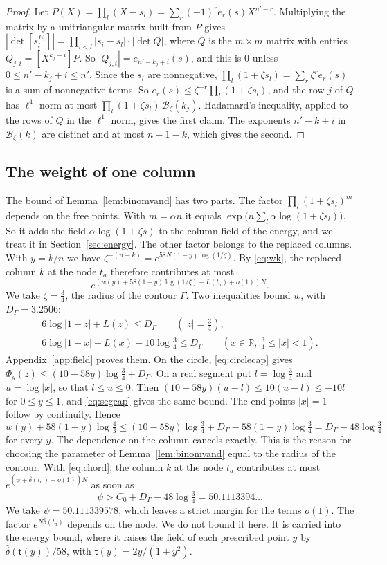 \documentclass[11pt]{amsart}
\newcommand{\Psiw}{50.111339578}
\newcommand{\Dcirc}{3.2506}
\theoremstyle{definition}
\theoremstyle{remark}
\numberwithin{equation}{section}
\newcommand{\R}{\mathbb R}
\begin{document}
\begin{proof}
Let $P(X)=\prod_l(X-s_l)=\sum_r(-1)^re_r(s)X^{n'-r}$. Multiplying the matrix by a unitriangular matrix built
from $P$ gives $|\det[s_l^{E_i}]|=\prod_{i<l}|s_i-s_l|\cdot|\det Q|$, where $Q$ is the $m\times m$ matrix with
entries $Q_{j,i}=[X^{k_j-i}]P$. So $|Q_{j,i}|=e_{n'-k_j+i}(s)$, and this is $0$ unless $0\le n'-k_j+i\le n'$.
Since the $s_l$ are nonnegative, $\prod_l(1+\zeta s_l)=\sum_r\zeta^re_r(s)$ is a sum of nonnegative terms. So
$e_r(s)\le\zeta^{-r}\prod_l(1+\zeta s_l)$, and the row $j$ of $Q$ has $\ell^1$ norm at most
$\prod_l(1+\zeta s_l)\,\mathcal B_\zeta(k_j)$. Hadamard's inequality, applied to the rows of $Q$ in the $\ell^1$ norm,
gives the first claim. The exponents $n'-k+i$ in $\mathcal B_\zeta(k)$ are distinct and at most $n-1-k$, which gives the
second.
\end{proof}

\subsection{The weight of one column}\label{ssec:weights}
The bound of Lemma~\ref{lem:binomvand} has two parts. The factor $\prod_l(1+\zeta s_l)^m$ depends on the free points.
With $m=\alpha n$ it equals $\exp\bigl(n\sum_l\alpha\log(1+\zeta s_l)\bigr)$. So it adds the field
$\alpha\log(1+\zeta s)$ to the column field of the energy, and we treat it in Section~\ref{sec:energy}. The other factor
belongs to the replaced columns. With $y=k/n$ we have $\zeta^{-(n-k)}=e^{58N(1-y)\log(1/\zeta)}$. By \eqref{eq:wk}, the
replaced column $k$ at the node $t_a$ therefore contributes at most
\[
 e^{(w(y)+58(1-y)\log(1/\zeta)-L(t_a)+o(1))N}.
\]
We take $\zeta=\frac34$, the radius of the contour $\Gamma$. Two inequalities bound $w$, with $D_\Gamma=\Dcirc$:
\begin{gather}
 6\log|1-z|+L(z)\le D_\Gamma\qquad(|z|=\tfrac34),\label{eq:circlecap}\\
 6\log|1-x|+L(x)-10\log\tfrac34\le D_\Gamma\qquad(x\in\R,\ \tfrac34\le|x|<1).\label{eq:segcap}
\end{gather}
Appendix~\ref{app:field} proves them. On the circle, \eqref{eq:circlecap} gives
$\Phi_y(z)\le(10-58y)\log\frac34+D_\Gamma$. On a real segment put $l=\log\frac34$ and $u=\log|x|$, so that $l\le u\le0$.
Then $(10-58y)(u-l)\le10(u-l)\le-10l$ for $0\le y\le1$, and \eqref{eq:segcap} gives the same bound. The end points
$|x|=1$ follow by continuity. Hence
\[
 w(y)+58(1-y)\log\tfrac43\le(10-58y)\log\tfrac34+D_\Gamma-58(1-y)\log\tfrac34=D_\Gamma-48\log\tfrac34
\]
for every $y$. The dependence on the column cancels exactly. This is the reason for choosing the parameter of
Lemma~\ref{lem:binomvand} equal to the radius of the contour. With \eqref{eq:chord}, the column $k$ at the node $t_a$
contributes at most $e^{(\psi+\hat\delta(t_a)+o(1))N}$ as soon as
\[
 \psi>C_0+D_\Gamma-48\log\tfrac34=50.1113394\ldots
\]
We take $\psi=\Psiw$, which leaves a strict margin for the terms $o(1)$. The factor $e^{N\hat\delta(t_a)}$ depends on the
node. We do not bound it here. It is carried into the energy bound, where it raises the field of each prescribed point
$y$ by $\hat\delta(\mathsf t(y))/58$, with $\mathsf t(y)=2y/(1+y^2)$.
\end{document}
